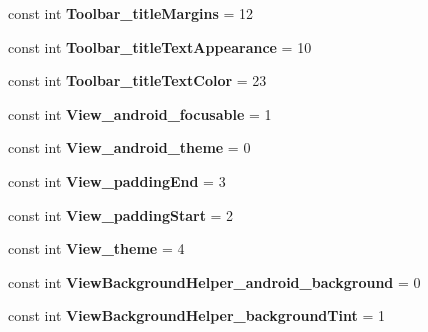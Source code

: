 \begin{DoxyCompactItemize}
const int {\bfseries Toolbar\+\_\+title\+Margins} = 12
\item 
\mbox{\label{classXaria_1_1Resource_1_1Styleable_abece18ff20a4f3ba0a1ffb4e20071e14}} 
const int {\bfseries Toolbar\+\_\+title\+Text\+Appearance} = 10
\item 
\mbox{\label{classXaria_1_1Resource_1_1Styleable_af3fdee64762ca896b2579d96225cfd31}} 
const int {\bfseries Toolbar\+\_\+title\+Text\+Color} = 23
\item 
\mbox{\label{classXaria_1_1Resource_1_1Styleable_a5129617c7cc5836038763e1be181a5fd}} 
const int {\bfseries View\+\_\+android\+\_\+focusable} = 1
\item 
\mbox{\label{classXaria_1_1Resource_1_1Styleable_a1f4aacfa083e83f42522e4fad0401416}} 
const int {\bfseries View\+\_\+android\+\_\+theme} = 0
\item 
\mbox{\label{classXaria_1_1Resource_1_1Styleable_a31b1bb71ddd769a22e1b6d9c21b39018}} 
const int {\bfseries View\+\_\+padding\+End} = 3
\item 
\mbox{\label{classXaria_1_1Resource_1_1Styleable_a11896a66b756e1cd1dd0055e453c6126}} 
const int {\bfseries View\+\_\+padding\+Start} = 2
\item 
\mbox{\label{classXaria_1_1Resource_1_1Styleable_a9ce60c686209ce588224045794193606}} 
const int {\bfseries View\+\_\+theme} = 4
\item 
\mbox{\label{classXaria_1_1Resource_1_1Styleable_a7a88231af2ca573aa769acebee1bc706}} 
const int {\bfseries View\+Background\+Helper\+\_\+android\+\_\+background} = 0
\item 
\mbox{\label{classXaria_1_1Resource_1_1Styleable_a93b26793567ddc83b2e7c73900acdd6e}} 
const int {\bfseries View\+Background\+Helper\+\_\+background\+Tint} = 1
\item 
\mbox{\label{classXaria_1_1Resource_1_1Styleable_adec1d38076028779c7c27f758fa57453}} 

\end{DoxyCompactItemize}
